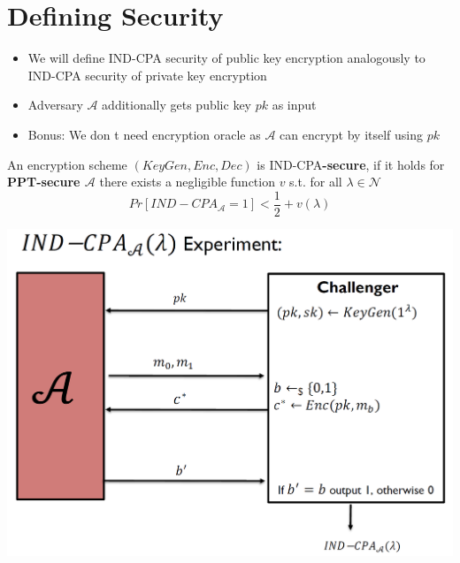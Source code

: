 \section{Defining Security}
	\begin{itemize}
		\item We will define IND-CPA security of public key encryption analogously to IND-CPA security of private key encryption
		\item Adversary $\mathcal{A}$ additionally gets public key $pk$ as input
		\item Bonus: We don t need encryption oracle as $\mathcal{A}$ can encrypt by itself using $pk$
	\end{itemize}

\newpage

\begin{definition}
	An encryption scheme $(KeyGen,Enc,Dec)$ is IND-CPA\textbf{-secure}, if it holds for \textbf{PPT-secure $\mathcal{A}$} 
	there exists a negligible function $v$ s.t. for all $\lambda \in \mathcal{N}$
	$$Pr[IND-CPA_{\mathcal{A}} = 1] < \frac{1}{2} + v(\lambda)$$
\end{definition}
\begin{center}
	\includegraphics[width=140mm]{Graphics/Public Key Encryption/pke2.png}
\end{center}

